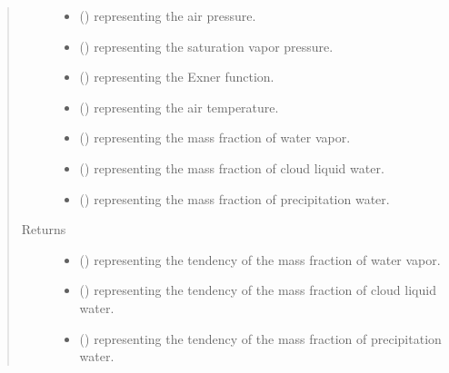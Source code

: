 \documentclass[letterpaper,10pt,english]{sphinxmanual}
\begin{document}
\begin{fulllineitems}
\begin{fulllineitems}
\begin{quote}
\begin{description}
\begin{itemize}
\item {} 
 () \textendash{}  representing the air pressure.

\item {} 
 () \textendash{}  representing the saturation vapor pressure.

\item {} 
 () \textendash{}  representing the Exner function.

\item {} 
 () \textendash{}  representing the air temperature.

\item {} 
 () \textendash{}  representing the mass fraction of water vapor.

\item {} 
 () \textendash{}  representing the mass fraction of cloud liquid water.

\item {} 
 () \textendash{}  representing the mass fraction of precipitation water.

\end{itemize}

\item[{Returns}] \leavevmode
\begin{itemize}
\item {} 
 () \textendash{}  representing the tendency of the mass fraction of water vapor.

\item {} 
 () \textendash{}  representing the tendency of the mass fraction of cloud liquid water.

\item {} 
 () \textendash{}  representing the tendency of the mass fraction of precipitation water.


\end{itemize}
\end{description}
\end{quote}
\end{fulllineitems}
\end{fulllineitems}
\end{document}
